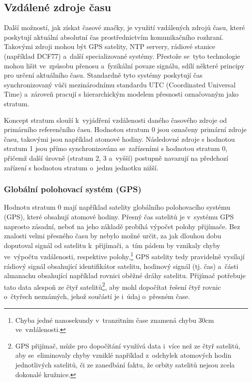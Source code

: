 \subsection{Vzdálené zdroje času}
Další možností, jak získat časové značky, je využití vzdálených zdrojů času, které poskytují aktuální absolutní čas prostřednictvím komunikačního rozhraní. Takovými zdroji mohou být GPS satelity, NTP servery, rádiové stanice (například DCF77) a~další specializované systémy. Přestože se~tyto technologie mohou lišit ve~způsobu přenosu a~fyzikální povaze signálu, sdílí některé principy pro určení aktuálního času. Standardně tyto systémy poskytují čas synchronizovaný vůči mezinárodnímu standardu UTC (Coordinated Universal Time) a~zároveň pracují s hierarchickým modelem přesnosti označovaným jako stratum.~\cite{sparkfun_gps, sookocheff_ntp}

Koncept stratum slouží k~vyjádření vzdálenosti daného časového zdroje od primárního referenčního času. Hodnotou stratum 0 jsou označeny primární zdroje času, takovými jsou například atomové hodiny. Následovné zdroje s hodnotou stratum 1 jsou přímo synchronizována se~zařízeními s hodnotou stratum 0, přičemž další úrovně (stratum 2, 3 a~vyšší) postupně navazují na předchozí zařízení s hodnotou stratum o~jednu jednotku nižší.~\cite{sookocheff_ntp}

\subsubsection{Globální polohovací systém (GPS)}
Hodnotu stratum 0 mají například satelity globálního polohovacího systému (GPS), které obsahují atomové hodiny. Přesný čas satelitů je v~systému GPS naprosto zásadní, neboť na jeho základě probíhá výpočet polohy přijímače. Bez znalosti velmi přesného času by nebylo možné určit, za jak dlouhou dobu doputoval signál od satelitu k~přijímači, a~tím pádem by vznikaly chyby ve~výpočtu vzdálenosti, respektive polohy.\footnote{Chyba jedné nanosekundy v~tranzitním čase znamená chybu 30cm ve~vzdálenosti.} GPS satelity tedy pravidelně vysílají rádiový signál obsahující identifikátor satelitu, hodinový signál (tj. čas) a~části almanachu obsahující například rovnici oběžné dráhy satelitu. Přijímač potřebuje tato data alespoň ze čtyř satelitů\footnote{GPS přijímač, může pro dopočítání využívá data i~více než ze čtyř satelitů, aby se~eliminovaly chyby vzniklé například z~odchylek atomových hodin jednotlivých satelitů, či ze zanedbání faktu, že orbity satelitů nejsou zcela dokonalé kružnice.}, aby mohl dopočítat řešení čtyř rovnic o~čtyřech neznámých, jehož součástí je i~údaj o~přesném čase.~\cite{sparkfun_gps}

